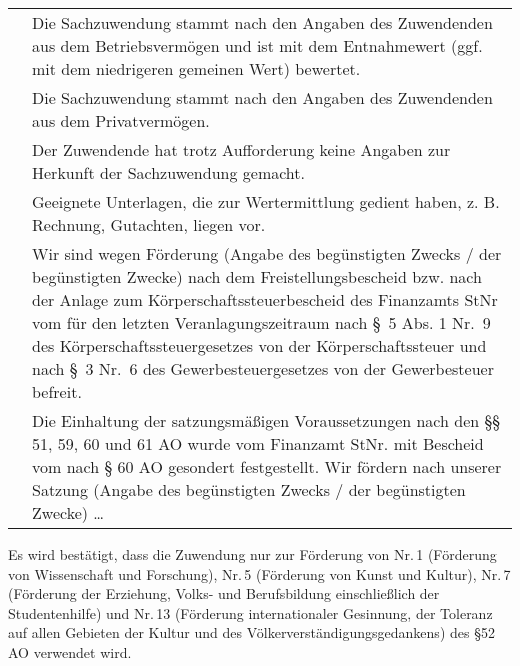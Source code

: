 \documentclass[12pt,ngerman]{scrartcl}
\newcommand{\marked}{\scalebox{1.5}{\XBox}} %
\newcommand{\notmarked}{\scalebox{1.5}{\Square}}
\begin{document}
{\footnotesize
\begin{tabular}{cp{}}
\hspace{1em} \marked & Die Sachzuwendung stammt nach den Angaben des Zuwendenden aus dem Betriebsvermögen und ist mit dem Entnahmewert (ggf. mit dem niedrigeren gemeinen Wert) bewertet. \\
\hspace{1em} \notmarked & Die Sachzuwendung stammt nach den Angaben des Zuwendenden aus dem Privatvermögen.  \\
\hspace{1em} \notmarked & Der Zuwendende hat trotz Aufforderung keine Angaben zur Herkunft der Sachzuwendung gemacht. \\
\hspace{1em} \notmarked & Geeignete Unterlagen, die zur Wertermittlung gedient haben, z. B. Rechnung, Gutachten, liegen vor. \\
\hspace{1em} \notmarked & Wir sind wegen Förderung (Angabe des begünstigten Zwecks / der begünstigten Zwecke) nach dem Freistellungsbescheid bzw. nach der Anlage zum Körperschaftssteuerbescheid des Finanzamts \hspace{5em} StNr \hspace{5em} vom \hspace{5em} für den letzten Veranlagungszeitraum \hspace{5em} nach §~5 Abs. 1 Nr.~9 des Körperschaftssteuergesetzes von der Körperschaftssteuer und nach §~3 Nr.~6 des Gewerbesteuergesetzes von der Gewerbesteuer befreit. \\
\hspace{1em} \notmarked & Die Einhaltung der satzungsmäßigen Voraussetzungen nach den §§ 51, 59, 60 und 61 AO wurde vom Finanzamt \hspace{5em} StNr. \hspace{5em} mit Bescheid vom \hspace{5em} nach § 60 AO gesondert festgestellt. Wir fördern nach unserer Satzung (Angabe des begünstigten Zwecks / der begünstigten Zwecke) \ldots
\end{tabular}}

\begin{mdframed}[style=MyFormStyle]%
Es wird bestätigt, dass die Zuwendung nur zur Förderung von Nr.\,1 (Förderung von Wissenschaft und Forschung), Nr.\,5 (Förderung von Kunst und Kultur), Nr.\,7 (Förderung der Erziehung, Volks- und Berufsbildung einschließlich der Studentenhilfe) und Nr.\,13 (Förderung internationaler Gesinnung, der Toleranz auf allen Gebieten der Kultur und des Völkerverständigungsgedankens) des §52 AO verwendet wird.
\end{mdframed}
\end{document}
